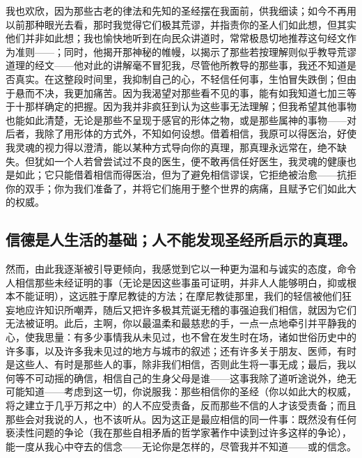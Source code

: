 我也欢欣，因为那些古老的律法和先知的圣经摆在我面前，供我细读；如今不再用以前那种眼光去看，那时我觉得它们极其荒谬，并指责你的圣人们如此想，但其实他们并非如此想；我也愉快地听到在向民众讲道时，常常极恳切地推荐这句经文作为准则——；同时，他揭开那神秘的帷幔，以揭示了那些若按理解则似乎教导荒谬道理的经文——他对此的讲解毫不冒犯我，尽管他所教导的那些事，我还不知道是否真实。在这整段时间里，我抑制自己的心，不轻信任何事，生怕冒失跌倒；但由于悬而不决，我更加痛苦。因为我渴望对那些看不见的事，能有如我知道七加三等于十那样确定的把握。因为我并非疯狂到认为这些事无法理解；但我希望其他事物也能如此清楚，无论是那些不呈现于感官的形体之物，或是那些属神的事物——对后者，我除了用形体的方式外，不知如何设想。借着相信，我原可以得医治，好使我灵魂的视力得以澄清，能以某种方式导向你的真理，那真理永远常在，绝不缺失。但犹如一个人若曾尝试过不良的医生，便不敢再信任好医生，我灵魂的健康也是如此；它只能借着相信而得医治，但为了避免相信谬误，它拒绝被治愈——抗拒你的双手；你为我们准备了，并将它们施用于整个世界的病痛，且赋予它们如此大的权威。\par


\subsection{信德是人生活的基础；人不能发现圣经所启示的真理。}

然而，由此我逐渐被引导更倾向，我感觉到它以一种更为温和与诚实的态度，命令人相信那些未经证明的事（无论是因这些事虽可证明，并非人人能够明白，抑或根本不能证明），这远胜于摩尼教徒的方法；在摩尼教徒那里，我们的轻信被他们狂妄地应许知识所嘲弄，随后又把许多极其荒诞无稽的事强迫我们相信，就因为它们无法被证明。此后，主啊，你以最温柔和最慈悲的手，一点一点地牵引并平静我的心，使我思量：有多少事情我从未见过，也不曾在发生时在场，诸如世俗历史中的许多事，以及许多我未见过的地方与城市的叙述；还有许多关于朋友、医师，有时是这些人、有时是那些人的事，除非我们相信，否则此生将一事无成；最后，我以何等不可动摇的确信，相信自己的生身父母是谁——这事我除了道听途说外，绝无可能知道——考虑到这一切，你说服我：那些相信你的圣经（你以如此大的权威，将之建立于几乎万邦之中）的人不应受责备，反而那些不信的人才该受责备；而且那些会对我说的人，也不该听从。因为这正是最应相信的同一件事：既然没有任何亵渎性问题的争论（我在那些自相矛盾的哲学家著作中读到过许多这样的争论），能一度从我心中夺去的信念——无论你是怎样的，尽管我并不知道——或的信念。\par

